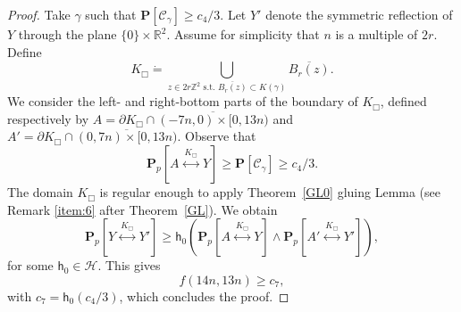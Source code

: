 \documentclass[12pt, twoside,a4paper,reqno]{amsart}
\theoremstyle{plain}
\theoremstyle{remark}
\theoremstyle{definition}
\newcommand{\Z}{\mathbb{Z}}
\newcommand{\R}{\mathbb{R}}
\newcommand{\PP}{\mathbf{P}}
\renewcommand{\P}[1]{\PP \left [ #1 \right ]}
\newcommand{\Pp}[1]{\PP_p \left [ #1 \right ]}
\newcommand{\lr}[1][]{\overset{\:#1\:}\longleftrightarrow}
\newcommand{\ol}{\overline}
\begin{document}
\begin{proof}
  Take $\gamma$ such that $\P{\mathcal C_{\gamma}} \ge c_4/3$. Let $Y'$ denote
  the symmetric reflection of $Y$ through the plane $\{0\}\times\R^2$. Assume
  for simplicity that $n$ is a multiple of $2r$.  Define 
  \[K_\Box\dot{=}\bigcup_{z\in 2r\Z^2\text{ s.t. } \ol{B_{r}(z)}\subset
    K(\gamma)} \ol{B_r(z)}.\] We consider the left- and right-bottom parts of
  the boundary of $K_\Box$, defined respectively by $A=\partial K_\Box\cap
  \ol{(-7n,0)\times[0,13n)}$ and $A'=\partial K_\Box\cap
  \ol{(0,7n)\times[0,13n)}$. Observe that
     \begin{equation}
       \label{eq:77}
       \Pp{A\lr[K_\Box]Y}\ge \P{\mathcal C_{\gamma}} \ge c_4/3.
     \end{equation}
The domain $K_\Box$ is regular enough to apply Theorem~\ref{GL0} gluing Lemma
(see Remark \ref{item:6} after Theorem~\ref{GL}). We obtain 
 $$\Pp{Y\lr[K_\Box] Y'}\ge\mathsf{h}_0 (\Pp{A\lr[K_\Box]Y}\wedge\Pp{A'\lr[K_\Box]Y'}),$$
for some $\mathsf{h}_0 \in \mathcal{H}$. 
This gives 
\begin{equation}
  \label{eq:78}
  f(14n,13n)\ge c_7,
\end{equation}
with $c_7 = \mathsf{h}_0 (c_4/3)$, which concludes the proof.

\end{proof}
\end{document}
